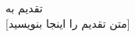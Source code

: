 \begin{acknowledgementpage}

\vspace{1.5cm}

{\nastaliq
{
تقدیم به\\[1cm]
\large [متن تقدیم را اینجا بنویسید]
}}

\end{acknowledgementpage}
\newpage
